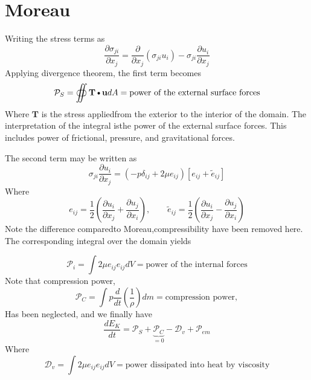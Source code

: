 \documentclass[11pt]{article}
\newcommand{\PD}{\partial}
\newcommand{\U}{\mathbf{u}}
\newcommand{\DOT}{\text{\textbullet}}
\begin{document}
\section{Moreau}
Writing the stress terms as
\begin{equation}
	\frac{\PD \sigma_{ji}}{\PD x_j} = 
	\frac{\PD}{\PD x_j} (\sigma_{ji}u_i) - 
	\sigma_{ji} \frac{\PD u_i}{\PD x_j}
\end{equation}
Applying divergence theorem, the first term becomes
\begin{equation}
	\mathcal P_S = \oiint \mathbf{T} \DOT \U dA = 
	\text{power of  the external surface forces}
\end{equation}
Where $\mathbf{T}$ is the stress appliedfrom the exterior to the interior of the domain. The interpretation of the integral isthe power of the external surface forces. This includes power of frictional, pressure, and gravitational forces.

The second term may be written as
\begin{equation}
	\sigma_{ji} \frac{\PD u_i}{\PD x_j} = 
	\left( -p \delta_{ij} + 2\mu e_{ij}\right) \left[ e_{ij} + \tilde{e}_{ij} \right]
\end{equation}
Where
\begin{equation}
	e_{ij} = \frac{1}{2} 
	\left( 
	\frac{\PD u_i}{\PD x_j} + \frac{\PD u_j}{\PD x_i}
	\right), 
	\qquad
	\tilde{e}_{ij} = \frac{1}{2}
	\left( 
	\frac{\PD u_i}{\PD x_j} - \frac{\PD u_j}{\PD x_i}
	\right)
\end{equation}
Note the difference comparedto Moreau,compressibility have been removed here. The corresponding integral over the domain yields

\begin{equation}
	\mathcal P_i = \int 2 \mu e_{ij} e_{ij} dV = 
	\text{power of the internal forces}
\end{equation}
Note that compression power,
\begin{equation}
	\mathcal P_C = \int p \frac{d}{dt} \left( \frac{1}{\rho} \right) dm = 
	\text{compression power},
\end{equation}
Has been neglected, and we finally have
\begin{equation}
	\frac{d E_K}{dt} = 
	\mathcal P_S + 
	\underbrace{\mathcal P_C}_{=0} - 
	\mathcal D_v +
	\mathcal P_{em}
\end{equation}
Where 
\begin{equation}
	\mathcal D_v = \int 2 \mu e_{ij} e_{ij} dV = 
	\text{power dissipated into heat by viscosity}
\end{equation}
\end{document}
